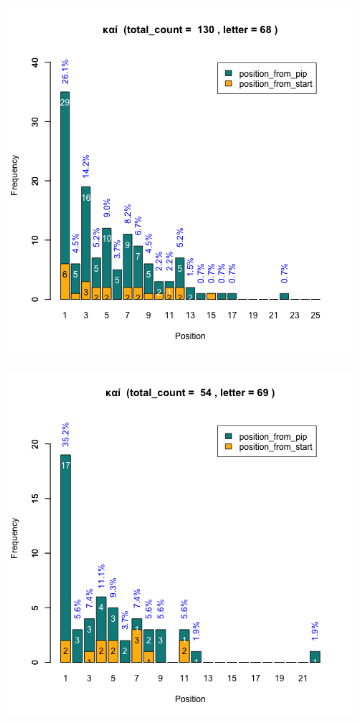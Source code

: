 \documentclass[a4paper]{article}
\begin{document}
\begin{figure}
\begin{subfigure}{0.45\textwidth}
\end{subfigure}
\begin{subfigure}{0.45\textwidth}
\centering
\includegraphics[width=1\linewidth]{../../data/output/paul_R_par/plots/par3_lt68.png}
\end{subfigure}
\begin{subfigure}{0.45\textwidth}
\centering
\includegraphics[width=1\linewidth]{../../data/output/paul_R_par/plots/par3_lt69.png}

\end{subfigure}
\end{figure}
\end{document}
